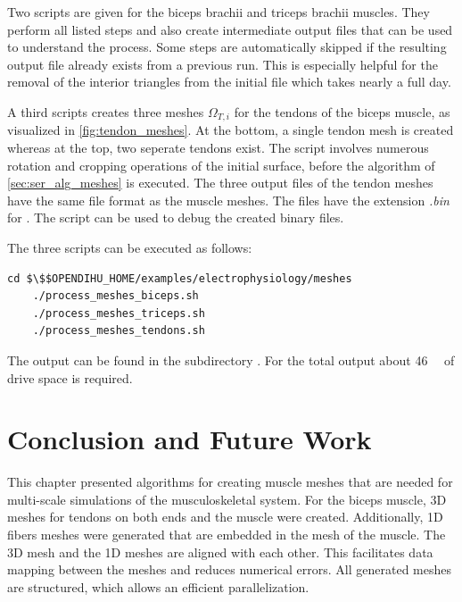 \begin{reproduce}
  Two scripts are given for the biceps brachii and triceps brachii muscles. They perform all listed steps and also create intermediate output files that can be used to understand the process. Some steps are automatically skipped if the resulting output file already exists from a previous run. This is especially helpful for the removal of the interior triangles from the initial file which takes nearly a full day.
  
  A third scripts creates three meshes $\Omega_{T,i}$ for the tendons of the biceps muscle, as visualized in \cref{fig:tendon_meshes}. At the bottom, a single tendon mesh is created whereas at the top, two seperate tendons exist. The script involves numerous rotation and cropping operations of the initial surface, before the algorithm of \cref{sec:ser_alg_meshes} is executed. The three output files of the tendon meshes have the same file format as the muscle meshes. The files have the extension \emph{.bin} for . The script  can be used to debug the created binary files.
  
  The three scripts can be executed as follows:
  \begin{lstlisting}[columns=fullflexible,breaklines=true,postbreak=\mbox{\textcolor{gray}{$\hookrightarrow$}\space}]
    cd $\$$OPENDIHU_HOME/examples/electrophysiology/meshes
    ./process_meshes_biceps.sh
    ./process_meshes_triceps.sh
    ./process_meshes_tendons.sh
  \end{lstlisting}
  The output can be found in the subdirectory . For the total output about \SI{46}{\gibi\byte} of drive space is required.
  
\end{reproduce}

\section{Conclusion and Future Work}\label{sec:meshes_summary_and_conclusion}

This chapter presented algorithms for creating muscle meshes that are needed for multi-scale simulations of the musculoskeletal system.
For the biceps muscle, 3D meshes for tendons on both ends and the muscle were created. Additionally, 1D fibers meshes were generated that are embedded in the mesh of the muscle. The 3D mesh and the 1D meshes are aligned with each other. This facilitates data mapping between the meshes and reduces numerical errors. All generated meshes are structured, which allows an efficient parallelization.

